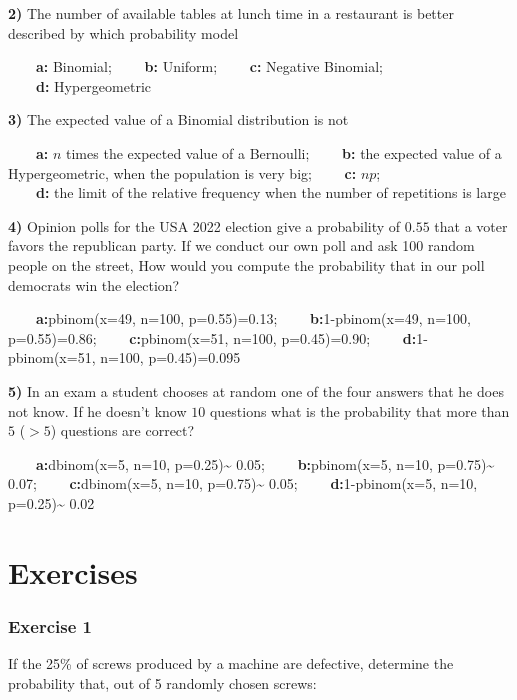 \documentclass[
]{book}
\begin{document}
\textbf{2)} The number of available tables at lunch time in a restaurant is better described by which probability model

\textbf{\(\qquad\)a:} Binomial;
\textbf{\(\qquad\)b:} Uniform;
\textbf{\(\qquad\)c:} Negative Binomial;\\
\textbf{\(\qquad\)d:} Hypergeometric

\textbf{3)} The expected value of a Binomial distribution is not

\textbf{\(\qquad\)a:} \(n\) times the expected value of a Bernoulli;
\textbf{\(\qquad\)b:} the expected value of a Hypergeometric, when the population is very big;
\textbf{\(\qquad\)c:} \(np\);\\
\textbf{\(\qquad\)d:} the limit of the relative frequency when the number of repetitions is large

\textbf{4)} Opinion polls for the USA 2022 election give a probability of \(0.55\) that a voter favors the republican party. If we conduct our own poll and ask 100 random people on the street, How would you compute the probability that in our poll democrats win the election?

\textbf{\(\qquad\)a:}pbinom(x=49, n=100, p=0.55)=0.13;
\textbf{\(\qquad\)b:}1-pbinom(x=49, n=100, p=0.55)=0.86;
\textbf{\(\qquad\)c:}pbinom(x=51, n=100, p=0.45)=0.90; \textbf{\(\qquad\)d:}1-pbinom(x=51, n=100, p=0.45)=0.095

\textbf{5)} In an exam a student chooses at random one of the four answers that he does not know. If he doesn't know \(10\) questions what is the probability that more than \(5\) (\(>5\)) questions are correct?

\textbf{\(\qquad\)a:}dbinom(x=5, n=10, p=0.25)\textasciitilde{} 0.05; \textbf{\(\qquad\)b:}pbinom(x=5, n=10, p=0.75)\textasciitilde{} 0.07; \textbf{\(\qquad\)c:}dbinom(x=5, n=10, p=0.75)\textasciitilde{} 0.05; \textbf{\(\qquad\)d:}1-pbinom(x=5, n=10, p=0.25)\textasciitilde{} 0.02

\hypertarget{exercises-5}{%
\section{Exercises}\label{exercises-5}}

\hypertarget{exercise-1-4}{%
\subsubsection{Exercise 1}\label{exercise-1-4}}

If the 25\% of screws produced by a machine are defective, determine the probability that, out of 5 randomly chosen screws:
\end{document}
